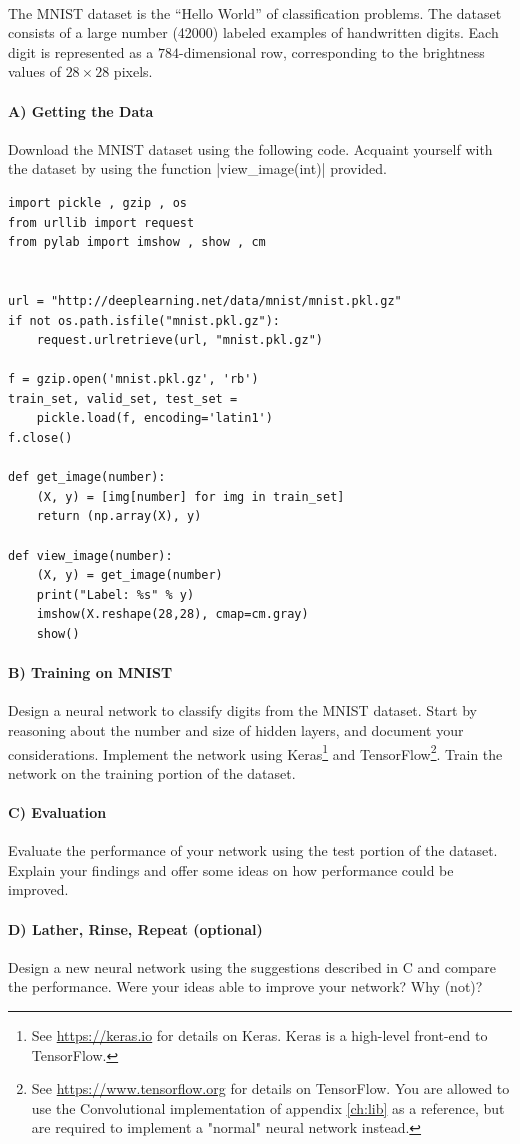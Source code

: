 \begin{exercise}[MNIST]\mbox{}\\
  The MNIST dataset is the \enquote{Hello World} of classification problems. The dataset consists of a large number (42000) labeled examples of handwritten digits. Each digit is represented as a $784$-dimensional row, corresponding to the brightness values of $28 \times 28$ pixels.
  \paragraph{A) Getting the Data}
  Download the MNIST dataset using the following code. Acquaint yourself with the dataset by using the function \py|view_image(int)| provided.
  \begin{lstlisting}
import pickle , gzip , os
from urllib import request
from pylab import imshow , show , cm


url = "http://deeplearning.net/data/mnist/mnist.pkl.gz"
if not os.path.isfile("mnist.pkl.gz"):
    request.urlretrieve(url, "mnist.pkl.gz")

f = gzip.open('mnist.pkl.gz', 'rb')
train_set, valid_set, test_set =
    pickle.load(f, encoding='latin1')
f.close()

def get_image(number):
    (X, y) = [img[number] for img in train_set]
    return (np.array(X), y)

def view_image(number):
    (X, y) = get_image(number)
    print("Label: %s" % y)
    imshow(X.reshape(28,28), cmap=cm.gray)
    show()
  \end{lstlisting}
  \paragraph{B) Training on MNIST}
  Design a neural network to classify digits from the MNIST dataset. Start by reasoning about the number and size of hidden layers, and document your considerations. Implement the network using Keras\footnote{See \url{https://keras.io} for details on Keras. Keras is a high-level front-end to TensorFlow.} and TensorFlow\footnote{See \url{https://www.tensorflow.org} for details on TensorFlow. You are allowed to use the Convolutional implementation of appendix \ref{ch:lib} as a reference, but are required to implement a "normal" neural network instead.}. Train the network on the training portion of the dataset.
  \paragraph{C) Evaluation}
  Evaluate the performance of your network using the test portion of the dataset. Explain your findings and offer some ideas on how performance could be improved.
  \paragraph{D) Lather, Rinse, Repeat (optional)}
  Design a new neural network using the suggestions described in C and compare the performance. Were your ideas able to improve your network? Why (not)?
\end{exercise}


